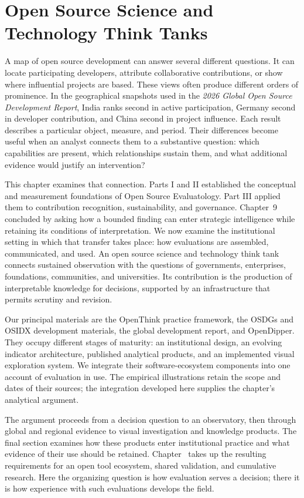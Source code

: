 \chapter{Open Source Science and Technology Think Tanks}
\label{ch:thinktanks}

A map of open source development can answer several different questions. It can locate participating developers, attribute collaborative contributions, or show where influential projects are based. These views often produce different orders of prominence. In the geographical snapshots used in the \emph{2026 Global Open Source Development Report}, India ranks second in active participation, Germany second in developer contribution, and China second in project influence. Each result describes a particular object, measure, and period. Their differences become useful when an analyst connects them to a substantive question: which capabilities are present, which relationships sustain them, and what additional evidence would justify an intervention?

This chapter examines that connection. Parts I and II established the conceptual and measurement foundations of Open Source Evaluatology. Part III applied them to contribution recognition, sustainability, and governance. Chapter~9 concluded by asking how a bounded finding can enter strategic intelligence while retaining its conditions of interpretation. We now examine the institutional setting in which that transfer takes place: how evaluations are assembled, communicated, and used. An open source science and technology think tank connects sustained observation with the questions of governments, enterprises, foundations, communities, and universities. Its contribution is the production of interpretable knowledge for decisions, supported by an infrastructure that permits scrutiny and revision.

Our principal materials are the OpenThink practice framework, the OSDGs and OSIDX development materials, the global development report, and OpenDipper. They occupy different stages of maturity: an institutional design, an evolving indicator architecture, published analytical products, and an implemented visual exploration system. We integrate their software-ecosystem components into one account of evaluation in use. The empirical illustrations retain the scope and dates of their sources; the integration developed here supplies the chapter's analytical argument.

The argument proceeds from a decision question to an observatory, then through global and regional evidence to visual investigation and knowledge products. The final section examines how these products enter institutional practice and what evidence of their use should be retained. Chapter~ takes up the resulting requirements for an open tool ecosystem, shared validation, and cumulative research. Here the organizing question is how evaluation serves a decision; there it is how experience with such evaluations develops the field.

